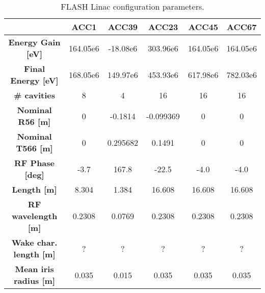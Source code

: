 \documentclass[a4paper,12pt]{article}
\begin{document}
\begin{table}
\begin{center}
  \begin{tabular}{|c||c|c|c|c|c|}
    \hline
      &\bf{ACC1} & \bf{ACC39} & \bf{ACC23} & \bf{ACC45} &\bf{ACC67}\\
    \hline
    \hline
      \bf{Energy Gain [eV]} & 164.05e6 & -18.08e6 & 303.96e6 & 164.05e6 & 164.05e6\\
    \hline
      \bf{Final Energy [eV]} & 168.05e6 & 149.97e6 & 453.93e6 & 617.98e6 & 782.03e6\\
    \hline
    \bf{\# cavities} & 8 & 4 & 16 & 16 & 16\\
    \hline
     \bf{Nominal R56 [m]} & 0 & -0.1814 &-0.099369 & 0 & 0\\
    \hline
     \bf{Nominal T566 [m]} & 0 & 0.295682 & 0.1491 & 0 & 0\\
    \hline
      \bf{RF Phase [deg]} & -3.7 & 167.8 & -22.5 & -4.0 & -4.0\\
    \hline
      \bf{Length [m]} & 8.304 & 1.384 & 16.608 & 16.608 & 16.608\\
    \hline
      \bf{RF wavelength [m]} & 0.2308 & 0.0769 & 0.2308 & 0.2308 & 0.2308\\
    \hline
      \bf{Wake char. length [m]} & ? & ? & ? & ? & ?\\
    \hline
      \bf{Mean iris radius [m]} & 0.035 & 0.015 & 0.035 & 0.035 & 0.035\\
    \hline	
  \end{tabular}
  \caption{FLASH Linac configuration parameters.}
\label{tbl:linac_config}
\end{center}
\end{table}
\end{document}
